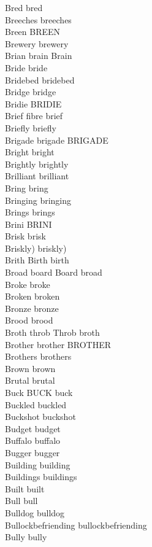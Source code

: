 Bred bred\\
Breeches breeches\\
Breen BREEN\\
Brewery brewery\\
Brian brain Brain\\
Bride bride\\
Bridebed bridebed\\
Bridge bridge\\
Bridie BRIDIE\\
Brief fibre brief\\
Briefly briefly\\
Brigade brigade BRIGADE\\
Bright bright\\
Brightly brightly\\
Brilliant brilliant\\
Bring bring\\
Bringing bringing\\
Brings brings\\
Brini BRINI\\
Brisk brisk\\
Briskly) briskly)\\
Brith Birth birth\\
Broad board Board broad\\
Broke broke\\
Broken broken\\
Bronze bronze\\
Brood brood\\
Broth throb Throb broth\\
Brother brother BROTHER\\
Brothers brothers\\
Brown brown\\
Brutal brutal\\
Buck BUCK buck\\
Buckled buckled\\
Buckshot buckshot\\
Budget budget\\
Buffalo buffalo\\
Bugger bugger\\
Building building\\
Buildings buildings\\
Built built\\
Bull bull\\
Bulldog bulldog\\
Bullockbefriending bullockbefriending\\
Bully bully\\
